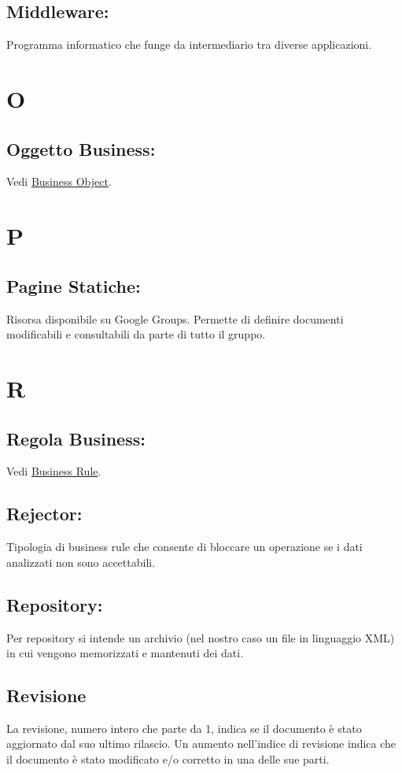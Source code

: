 \section{Middleware:}
Programma informatico che funge da intermediario tra diverse applicazioni.

\chapter{O}
\section{Oggetto Business:}
Vedi \hyperlink{Business Object}{Business Object}.

\chapter{P}
\section{Pagine Statiche:}
Risorsa disponibile su Google Groups. Permette di definire documenti modificabili e consultabili da parte di tutto il gruppo.

\chapter{R}
\section{Regola Business:}
Vedi \hyperlink{Business Rule}{Business Rule}.
\section{Rejector:}
Tipologia di business rule che consente di bloccare un operazione se i dati analizzati non sono accettabili.
\section{Repository:} 
Per repository si intende un archivio (nel nostro caso un file in linguaggio XML) in cui vengono memorizzati e mantenuti dei dati.
\section{Revisione}
La revisione, numero intero che parte da 1, indica se il documento \`e stato aggiornato dal suo ultimo rilascio. Un aumento nell'indice di revisione indica che il documento \`e stato modificato e/o corretto in una delle sue parti.

